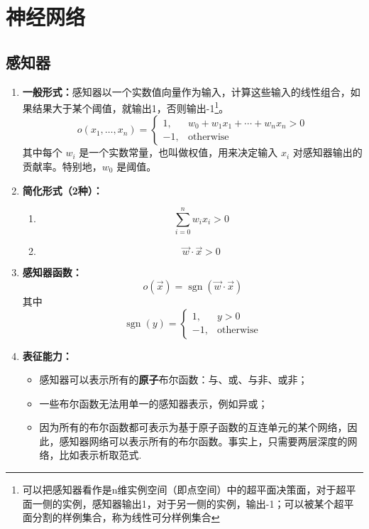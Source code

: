 \documentclass[../main.tex]{subfiles}
\begin{document}
\section{神经网络}\label{sec:neural-network}

\subsection{感知器}\label{sec:perceptron}
\begin{enumerate}
    \item \textbf{一般形式：}感知器以一个实数值向量作为输入，计算这些输入的线性组合，如果结果大于某个阈值，就输出1，否则输出-1\footnote{可以把感知器看作是n维实例空间（即点空间）中的超平面决策面，对于超平面一侧的实例，感知器输出1，对于另一侧的实例，输出-1；可以被某个超平面分割的样例集合，称为线性可分样例集合}。
    \[
    o(x_1,\ldots,x_n)=
    \begin{cases}
    1, & w_0 + w_1x_1 + \cdots + w_nx_n > 0 \\
    -1, & \text{otherwise}
    \end{cases}
    \]
    其中每个 $w_i$ 是一个实数常量，也叫做权值，用来决定输入 $x_i$ 对感知器输出的贡献率。特别地，$w_0$ 是阈值。
    \item \textbf{简化形式（2种）：}
    \begin{enumerate}
        \item
        \[
        \sum_{i=0}^{n} w_i x_i > 0
        \]
        \item
        \[
        \vec{w}\cdot\vec{x} > 0
        \]
    \end{enumerate}
    \item \textbf{感知器函数：}
    \[
        o(\vec{x}) = \operatorname{sgn}(\vec{w}\cdot\vec{x})
    \]
    其中
    \[
        \operatorname{sgn}(y)=
        \begin{cases}
            1, & y > 0 \\
            -1, & \text{otherwise}
        \end{cases}
    \]
    \item \textbf{表征能力：}
    \begin{itemize}
        \item 感知器可以表示所有的\textbf{原子}布尔函数：与、或、与非、或非；
        \item 一些布尔函数无法用单一的感知器表示，例如异或；
        \item 因为所有的布尔函数都可表示为基于原子函数的互连单元的某个网络，因此，感知器网络可以表示所有的布尔函数。事实上，只需要两层深度的网络，比如表示析取范式.

\end{itemize}
\end{enumerate}
\end{document}
